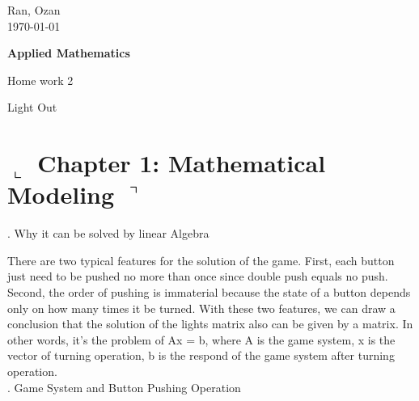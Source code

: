 \documentclass[]{article}
\title{}
\author{Ran, Ozan}
\begin{document}
 

\begin{flushright}
Ran, Ozan\\
\today\\
\end{flushright}

\centerline{ \Huge  \textbf{Applied Mathematics} }
\centerline{\Large  Home work 2}
\centerline{\Large  Light Out}


\section*{ $\llcorner$  Chapter 1: Mathematical Modeling $\urcorner$}
. Why it can be solved by linear Algebra

There are two typical features for the solution of the game. First, each button just need to be pushed no more than once since double push equals no push. Second, the order of pushing is immaterial because the state of a button depends only on how many times it be turned. With these two features, we can draw a conclusion that the solution of the lights matrix also can be given by a matrix. In other words, it's the problem of Ax = b, where A is the game system, x is the vector of turning operation, b is the respond of the game system after turning operation.
\\

. Game System and Button Pushing Operation
\end{document}
